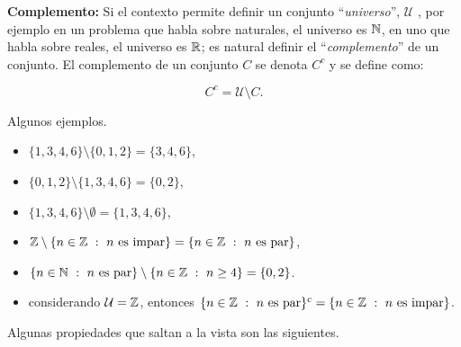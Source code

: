 \textbf{Complemento:} Si el contexto permite definir un conjunto ``\emph{universo}'', $\mathcal{U}$ , por ejemplo en un problema que habla sobre naturales, el universo es $\mathbb{N}$, en uno que habla sobre reales, el universo es $\mathbb{R}$; es natural definir el ``\emph{complemento}'' de un conjunto. El complemento de un conjunto $C$ se denota $C^c$ y se define como:

$$C^c=\mathcal{U}\setminus C.$$

\medskip


\begin{ejemplo}
	Algunos ejemplos.
	\begin{itemize}
		\item $\{1,3,4,6\}\setminus\{0,1,2\}=\{3,4,6\}$,
		\item $\{ 0,1,2\}\setminus\{1,3,4,6\}=\{0,2\}$,
		\item $\{1,3,4,6\}\setminus\emptyset=
			\{1,3,4,6\}$,
		\item $\mathbb{Z}\setminus\{ n\in\mathbb{Z}\ :\ n\textrm{ es impar}\}=
			\{n\in\mathbb{Z}\ :\ n\textrm{ es par}\}$,
		\item $\{n\in\mathbb{N}\ :\ n\textrm{ es par}\}\setminus
			\{ n\in\mathbb{Z}\ :\ n\ge 4\}=\{ 0,2\}$.
		\item considerando $\mathcal{U}=\mathbb{Z}$, entonces $\{n\in\mathbb{Z}\ :\ n\textrm{ es par}\}^c=\{ n\in\mathbb{Z}\ :\ n\textrm{ es impar}\}$.
	\end{itemize}
\end{ejemplo}

Algunas propiedades que saltan a la vista son las siguientes.

\medskip


